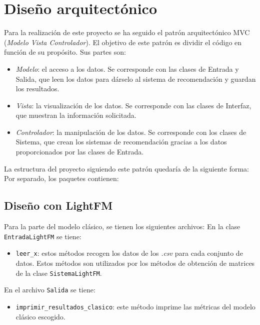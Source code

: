 \section{Diseño arquitectónico}
Para la realización de este proyecto se ha seguido el patrón arquitectónico MVC (\textit{Modelo Vista Controlador}). El objetivo de este patrón es dividir el código en función de su propósito. Sus partes son:
\begin{itemize}
\tightlist
\item \textit{Modelo}: el acceso a los datos. Se corresponde con las clases de Entrada y Salida, que leen los datos para dárselo al sistema de recomendación y guardan los resultados.
\item \textit{Vista}: la visualización de los datos. Se corresponde con las clases de Interfaz, que muestran la información solicitada.
\item \textit{Controlador}: la manipulación de los datos. Se corresponde con los clases de Sistema, que crean los sistemas de recomendación gracias a los datos proporcionados por las clases de Entrada.
\end{itemize}


La estructura del proyecto siguiendo este patrón quedaría de la siguiente forma:
Por separado, los paquetes contienen:

\subsection{Diseño con LightFM}\label{diseño-lightfm}
Para la parte del modelo clásico, se tienen los siguientes archivos:
En la clase \texttt{EntradaLightFM} se tiene:
\begin{itemize}
\tightlist
\item \texttt{leer\_x}: estos métodos recogen los datos de los \textit{.csv} para cada conjunto de datos. Estos métodos son utilizados por los métodos de obtención de matrices de la clase \texttt{SistemaLightFM}.
\end{itemize}

En el archivo \texttt{Salida} se tiene:
\begin{itemize}
\tightlist
\item \texttt{imprimir\_resultados\_clasico}: este método imprime las métricas del modelo clásico escogido.
\end{itemize}

